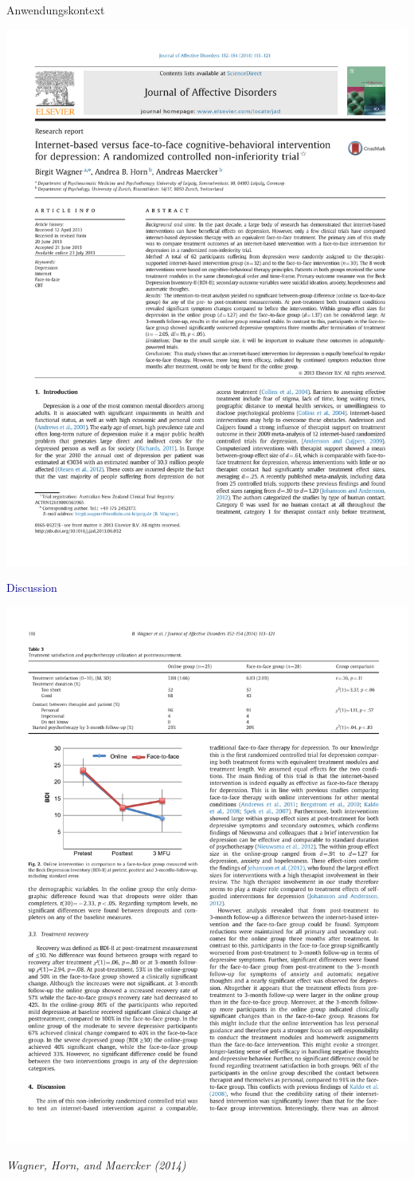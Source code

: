 \documentclass[
  8pt,
  ignorenonframetext,
]{beamer}
\begin{document}
\begin{frame}[t]{Anwendungskontext}
\protect\hypertarget{anwendungskontext-13}{}
\begin{center}\includegraphics[width=0.5\linewidth]{8_Abbildungen/alm_8_article_title} \end{center}
\center

\textcolor{darkblue}{Discussion}

\begin{center}\includegraphics[width=0.5\linewidth]{8_Abbildungen/alm_8_article_discussion} \end{center}
\flushright
\footnotesize

\emph{Wagner, Horn, and Maercker (2014)}
\end{frame}
\end{document}

